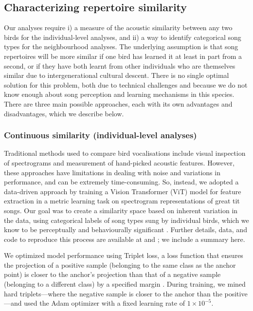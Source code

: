 \documentclass[9pt, onecolumn, twoside, lineno]{gsajnl}
\begin{document}
\subsection{Characterizing repertoire similarity}

Our analyses require i) a measure of the acoustic similarity between any two birds for the individual-level analyses, and ii) a way to identify categorical song types for the neighbourhood analyses. The underlying assumption is that song repertoires will be more similar if one bird has learned it at least in part from a second, or if they have both learnt from other individuals who are themselves similar due to intergenerational cultural descent. There is no single optimal solution for this problem, both due to technical challenges and because we do not know enough about song perception and learning mechanisms in this species. There are three main possible approaches, each with its own advantages and disadvantages, which we describe below.

\subsubsection{Continuous similarity (individual-level analyses)}
\label{sc:song-similarity}

Traditional methods used to compare bird vocalisations include visual inspection of spectrograms and measurement of hand-picked acoustic features. However, these approaches have limitations in dealing with noise and variations in performance, and can be extremely time-consuming. So, instead, we adopted a data-driven approach by training a Vision Transformer (ViT) model for feature extraction in a metric learning task on spectrogram representations of great tit songs. Our goal was to create a similarity space based on inherent variation in the data, using categorical labels of song types sung by individual birds, which we know to be perceptually and behaviourally significant \autocite{lind1996}. Further details, data, and code to reproduce this process are available at \autocite{merinorecalde2023} and \autocite{merinorecalde2023a}; we include a summary here.

We optimized model performance using Triplet loss, a loss function that ensures the projection of a positive sample (belonging to the same class as the anchor point) is closer to the anchor's projection than that of a negative sample (belonging to a different class) by a specified margin \autocite{hermans2017, hoffer2018}. During training, we mined hard triplets---where the negative sample is closer to the anchor than the positive---and used the Adam optimizer with a fixed learning rate of $1 \times 10^{-5}$.
\end{document}
